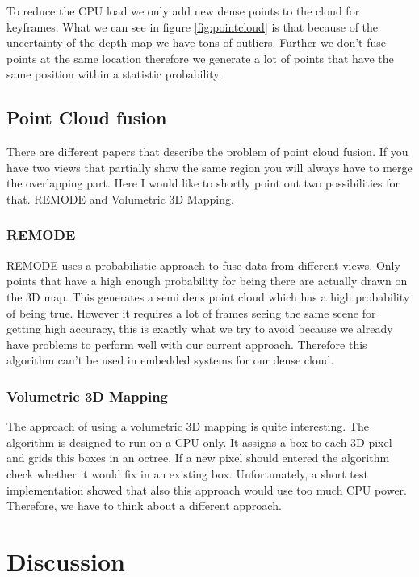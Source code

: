 \documentclass[11pt,a4paper,titlepage,oneside]{report}
\begin{document}
To reduce the CPU load we only add new dense points to the cloud for keyframes. What we can see in figure \ref{fig:pointcloud} is that because of the uncertainty of the depth map we have tons of outliers. Further we don't fuse points at the same location therefore we generate a lot of points that have the same position within a statistic probability.

\section{Point Cloud fusion}

There are different papers that describe the problem of point cloud fusion. If you have two views that partially show the same region you will always have to merge the overlapping part. Here I would like to shortly point out two possibilities for that. REMODE and Volumetric 3D Mapping.

\subsection{REMODE}

REMODE uses a probabilistic approach to fuse data from different views. Only points that have a high enough probability for being there are actually drawn on the 3D map. This generates a semi dens point cloud which has a high probability of being true. However it requires a lot of frames seeing the same scene for getting high accuracy, this is exactly what we try to avoid because we already have problems to perform well with our current approach. Therefore this algorithm can't be used in embedded systems for our dense cloud.

\subsection{Volumetric 3D Mapping}

The approach of using a volumetric 3D mapping is quite interesting. The algorithm is designed to run on a CPU only. It assigns a box to each 3D pixel and grids this boxes in an octree. If a new pixel should entered the algorithm check whether it would fix in an existing box. Unfortunately, a short test implementation showed that also this approach would use too much CPU power. Therefore, we have to think about a different approach.

\chapter{Discussion}
\end{document}
